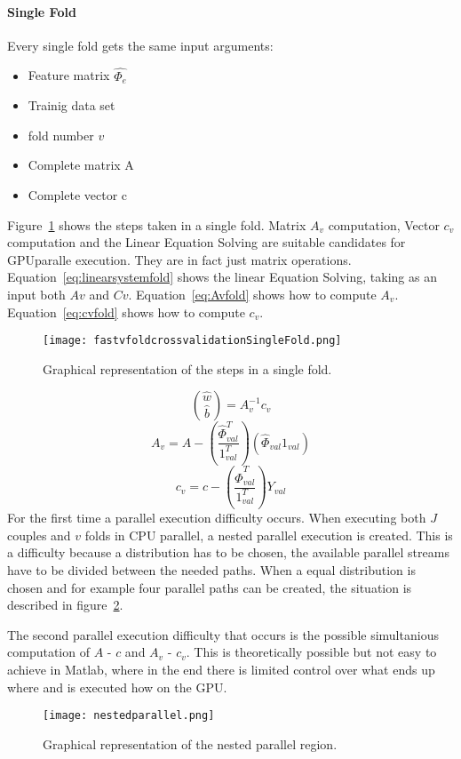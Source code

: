 \paragraph{Single Fold}
Every single fold gets the same input arguments: 
\begin{itemize}
	\item Feature matrix $\hat{\Phi_e}$
	\item Trainig data set
	\item fold number $v$
	\item Complete matrix A
	\item Complete vector c
\end{itemize}
Figure~\ref{fig:singleFold} shows the steps taken in a single fold.
Matrix $A_v$ computation, Vector $c_v$ computation and the Linear Equation Solving are suitable candidates for GPUparalle execution.
They are in fact just matrix operations.
Equation~\ref{eq:linearsystemfold} shows the linear Equation Solving, taking as an input both $Av$ and $Cv$.
Equation~\ref{eq:Avfold} shows how to compute $A_v$.
Equation~\ref{eq:cvfold} shows how to compute $c_v$.

\begin{figure}
	\centering
	\texttt{[image: fastvfoldcrossvalidationSingleFold.png]}
	\caption{Graphical representation of the steps in a single fold.}
	\label{fig:singleFold}
\end{figure}
\begin{equation}
	\binom{\hat{w}}{\hat{b}} = A_v^{-1}c_v
	\label{eq:linearsystemfold}
\end{equation}
\begin{equation}
	A_v = A - \left(\frac{\hat{\Phi}_{val}^T}{1_{val}^T}\right)  \left(\hat{\Phi}_{val} 1_{val}\right)
	\label{eq:Avfold}
\end{equation}
\begin{equation}
	c_v = c - \left(\frac{\hat{\Phi}_{val}^T}{1_{val}^T}\right)Y_{val}
	\label{eq:cvfold}
\end{equation}
For the first time a parallel execution difficulty occurs.
When executing both $J$ couples and $v$ folds in CPU parallel, a nested parallel execution is created.
This is a difficulty because a distribution has to be chosen, the available parallel streams have to be divided between the needed paths.
When a equal distribution is chosen and for example four parallel paths can be created, the situation is described in figure~\ref{fig:nestedparallel}.
\par
The second parallel execution difficulty that occurs is the possible simultanious computation of $A$ - $c$ and $A_v$ - $c_v$.
This is theoretically possible but not easy to achieve in Matlab, where in the end there is limited control over what ends up where and is executed how on the GPU.
\begin{figure}
	\centering
	\texttt{[image: nestedparallel.png]}
	\caption{Graphical representation of the nested parallel region.}
	\label{fig:nestedparallel}
\end{figure}
